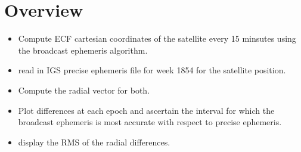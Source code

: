 
\section{Overview}
\begin{itemize}
	\item Compute ECF cartesian coordinates of the satellite every 15 minsutes using the broadcast ephemeris algorithm.
	\item read in IGS precise ephemeris file for week 1854 for the satellite position.
	\item Compute the radial vector for both.
	\item Plot differences at each epoch and ascertain the interval for which the broadcast ephemeris is most accurate with respect to precise ephemeris.
	\item display the RMS of the radial differences.
\end{itemize}